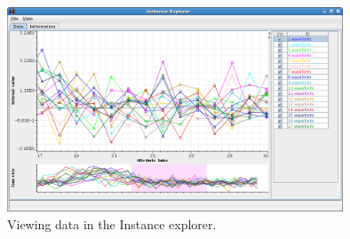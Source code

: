 \begin{figure}[htb]
  \centering
  \includegraphics[width=10.0cm]{images/instance-explorer_view.png}
  \caption{Viewing data in the Instance explorer.}
  \label{instance-explorer_view}
\end{figure}
